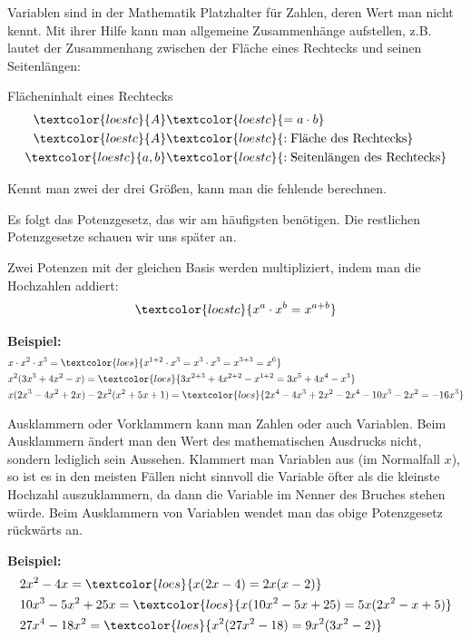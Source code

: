 Variablen sind in der Mathematik Platzhalter für Zahlen, deren Wert man nicht kennt. Mit ihrer Hilfe kann man allgemeine Zusammenhänge aufstellen, z.B. lautet der Zusammenhang zwischen der Fläche eines Rechtecks und seinen Seitenlängen:
\begin{tcolorbox}
	Flächeninhalt eines Rechtecks
	\begin{align*}
		\textcolor{loestc}{A}&\textcolor{loestc}{=a\cdot b}\\
		\textcolor{loestc}{A}&\textcolor{loestc}{: \text{Fläche des Rechtecks}}\\
		\textcolor{loestc}{a, b}&\textcolor{loestc}{: \text{Seitenlängen des Rechtecks}}
	\end{align*}
\end{tcolorbox}
Kennt man zwei der drei Größen, kann man die fehlende berechnen.

Es folgt das Potenzgesetz, das wir am häufigsten benötigen. Die restlichen Potenzgesetze schauen wir uns später an.
\begin{tcolorbox}
	Zwei Potenzen mit der gleichen Basis werden multipliziert, indem man die Hochzahlen addiert:
	\begin{align*}
		\textcolor{loestc}{x^a\cdot x^b=x^{a+b}}
	\end{align*}
\end{tcolorbox}

\textbf{Beispiel:}
\begin{align*}
	&x\cdot x^2 \cdot x^3=\textcolor{loes}{x^{1+2}\cdot x^3=x^3\cdot x^3=x^{3+3}=x^6}\\
	&x^2(3x^3+4x^2-x)=\textcolor{loes}{3x^{2+3}+4x^{2+2}-x^{1+2}=3x^5+4x^4-x^3}\\
	&x(2x^3-4x^2+2x)-2x^2(x^2+5x+1)=\textcolor{loes}{2x^4-4x^3+2x^2-2x^4-10x^3-2x^2=-16x^3}
\end{align*}

Ausklammern oder Vorklammern kann man Zahlen oder auch Variablen. Beim Ausklammern ändert man den Wert des mathematischen Ausdrucks nicht, sondern lediglich sein Aussehen. Klammert man Variablen aus (im Normalfall \(x\)), so ist es in den meisten Fällen nicht sinnvoll die Variable öfter als die kleinste Hochzahl auszuklammern, da dann die Variable im Nenner des Bruches stehen würde. Beim Ausklammern von Variablen wendet man das obige Potenzgesetz rückwärts an.

\textbf{Beispiel:}
\begin{align*}
	&2x^2-4x=\textcolor{loes}{x(2x-4)=2x(x-2)}\\
	&10x^3-5x^2+25x=\textcolor{loes}{x(10x^2-5x+25)=5x(2x^2-x+5)}\\
	&27x^4-18x^2=\textcolor{loes}{x^2(27x^2-18)=9x^2(3x^2-2)}
\end{align*}

